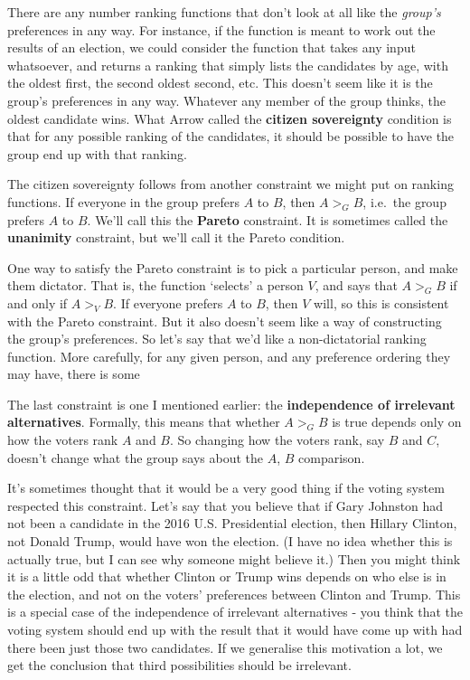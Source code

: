 \documentclass[11pt,]{article}
\begin{document}
There are any number ranking functions that don't look at all like the
\emph{group's} preferences in any way. For instance, if the function is
meant to work out the results of an election, we could consider the
function that takes any input whatsoever, and returns a ranking that
simply lists the candidates by age, with the oldest first, the second
oldest second, etc. This doesn't seem like it is the group's preferences
in any way. Whatever any member of the group thinks, the oldest
candidate wins. What Arrow called the \textbf{citizen sovereignty}
condition is that for any possible ranking of the candidates, it should
be possible to have the group end up with that ranking.

The citizen sovereignty follows from another constraint we might put on
ranking functions. If everyone in the group prefers \(A\) to \(B\), then
\(A >_G B\), i.e.~the group prefers \(A\) to \(B\). We'll call this the
\textbf{Pareto} constraint. It is sometimes called the
\textbf{unanimity} constraint, but we'll call it the Pareto condition.

One way to satisfy the Pareto constraint is to pick a particular person,
and make them dictator. That is, the function `selects' a person \(V\),
and says that \(A >_G B\) if and only if \(A >_V B\). If everyone
prefers \(A\) to \(B\), then \(V\) will, so this is consistent with the
Pareto constraint. But it also doesn't seem like a way of constructing
the group's preferences. So let's say that we'd like a non-dictatorial
ranking function. More carefully, for any given person, and any
preference ordering they may have, there is some

The last constraint is one I mentioned earlier: the \textbf{independence
of irrelevant alternatives}. Formally, this means that whether
\(A >_G B\) is true depends only on how the voters rank \(A\) and \(B\).
So changing how the voters rank, say \(B\) and \(C\), doesn't change
what the group says about the \(A\), \(B\) comparison.

It's sometimes thought that it would be a very good thing if the voting
system respected this constraint. Let's say that you believe that if
Gary Johnston had not been a candidate in the 2016 U.S. Presidential
election, then Hillary Clinton, not Donald Trump, would have won the
election. (I have no idea whether this is actually true, but I can see
why someone might believe it.) Then you might think it is a little odd
that whether Clinton or Trump wins depends on who else is in the
election, and not on the voters' preferences between Clinton and Trump.
This is a special case of the independence of irrelevant alternatives -
you think that the voting system should end up with the result that it
would have come up with had there been just those two candidates. If we
generalise this motivation a lot, we get the conclusion that third
possibilities should be irrelevant.
\end{document}
